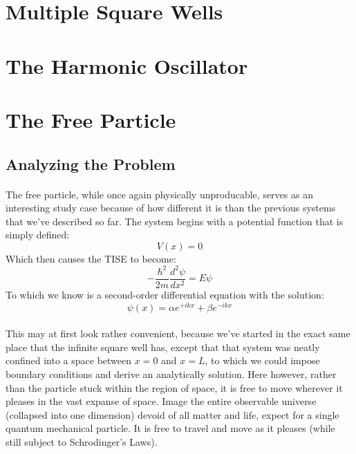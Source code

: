 \documentclass[12pt,letterpaper]{book}
\begin{document}

\section{Multiple Square Wells}



\section{The Harmonic Oscillator}



\section{The Free Particle}

\subsection*{Analyzing the Problem}

\paragraph*{}The free particle, while once again physically unproducable, serves as an interesting study case because of how different it is than the previous systems that we've described so far. The system begins with a potential function that is simply defined:
\begin{equation}
\label{Free Particle Potential}
V(x) = 0
\end{equation}
Which then causes the TISE to become:
\begin{equation}
\label{Free Particle TISE}
-\frac{\hbar^2}{2m}\frac{d^2 \psi}{dx^2} = E\psi
\end{equation}
To which we know is a second-order differential equation with the solution:
\begin{equation}
\psi(x) = \alpha e^{+ikx} + \beta e^{-ikx}
\end{equation}

\paragraph*{}This may at first look rather convenient, because we've started in the exact same place that the infinite square well has, except that that system was neatly confined into a space between $x = 0$ and $x = L$, to which we could impose boundary conditions and derive an analytically solution. Here however, rather than the particle stuck within the region of space, it is free to move wherever it pleases in the vast expanse of space. Image the entire observable universe (collapsed into one dimension) devoid of all matter and life, expect for a single quantum mechanical particle. It is free to travel and move as it pleases (while still subject to Schrodinger's Laws).
\end{document}
